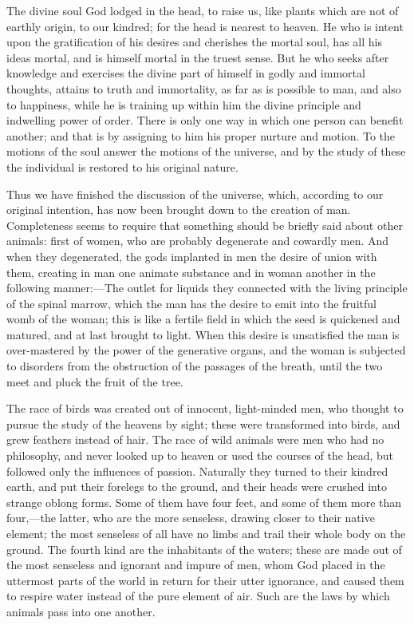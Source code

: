 The divine soul God lodged in the head, to raise us, like plants which are
not of earthly origin, to our kindred; for the head is nearest to heaven.
He who is intent upon the gratification of his desires and cherishes the
mortal soul, has all his ideas mortal, and is himself mortal in the truest
sense. But he who seeks after knowledge and exercises the divine part of
himself in godly and immortal thoughts, attains to truth and immortality,
as far as is possible to man, and also to happiness, while he is training
up within him the divine principle and indwelling power of order. There is
only one way in which one person can benefit another; and that is by
assigning to him his proper nurture and motion. To the motions of the soul
answer the motions of the universe, and by the study of these the
individual is restored to his original nature.

Thus we have finished the discussion of the universe, which, according to
our original intention, has now been brought down to the creation of man.
Completeness seems to require that something should be briefly said about
other animals: first of women, who are probably degenerate and cowardly
men. And when they degenerated, the gods implanted in men the desire of
union with them, creating in man one animate substance and in woman
another in the following manner:—The outlet for liquids they
connected with the living principle of the spinal marrow, which the man
has the desire to emit into the fruitful womb of the woman; this is like a
fertile field in which the seed is quickened and matured, and at last
brought to light. When this desire is unsatisfied the man is over-mastered
by the power of the generative organs, and the woman is subjected to
disorders from the obstruction of the passages of the breath, until the
two meet and pluck the fruit of the tree.

The race of birds was created out of innocent, light-minded men, who
thought to pursue the study of the heavens by sight; these were
transformed into birds, and grew feathers instead of hair. The race of
wild animals were men who had no philosophy, and never looked up to heaven
or used the courses of the head, but followed only the influences of
passion. Naturally they turned to their kindred earth, and put their
forelegs to the ground, and their heads were crushed into strange oblong
forms. Some of them have four feet, and some of them more than four,—the
latter, who are the more senseless, drawing closer to their native
element; the most senseless of all have no limbs and trail their whole
body on the ground. The fourth kind are the inhabitants of the waters;
these are made out of the most senseless and ignorant and impure of men,
whom God placed in the uttermost parts of the world in return for their
utter ignorance, and caused them to respire water instead of the pure
element of air. Such are the laws by which animals pass into one another.

